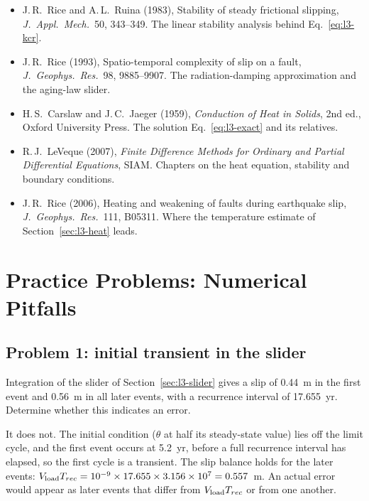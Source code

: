 \begin{itemize}[itemsep=2pt,topsep=2pt]
\item J.\,R.\ Rice and A.\,L.\ Ruina (1983), Stability of steady frictional slipping, \emph{J.\ Appl.\ Mech.}\ 50, 343--349. The linear stability analysis behind Eq.~\eqref{eq:l3-kcr}.
\item J.\,R.\ Rice (1993), Spatio-temporal complexity of slip on a fault, \emph{J.\ Geophys.\ Res.}\ 98, 9885--9907. The radiation-damping approximation and the aging-law slider.
\item H.\,S.\ Carslaw and J.\,C.\ Jaeger (1959), \emph{Conduction of Heat in Solids}, 2nd ed., Oxford University Press. The solution Eq.~\eqref{eq:l3-exact} and its relatives.
\item R.\,J.\ LeVeque (2007), \emph{Finite Difference Methods for Ordinary and Partial Differential Equations}, SIAM. Chapters on the heat equation, stability and boundary conditions.
\item J.\,R.\ Rice (2006), Heating and weakening of faults during earthquake slip, \emph{J.\ Geophys.\ Res.}\ 111, B05311. Where the temperature estimate of Section~\ref{sec:l3-heat} leads.
\end{itemize}

\section{Practice Problems: Numerical Pitfalls}
\label{sec:l3-problems}

\subsection*{Problem 1: initial transient in the slider}

Integration of the slider of Section~\ref{sec:l3-slider} gives a slip of 0.44~m in the first event and 0.56~m in all later events, with a recurrence interval of 17.655~yr. Determine whether this indicates an error.

\solution It does not. The initial condition ($\theta$ at half its steady-state value) lies off the limit cycle, and the first event occurs at 5.2~yr, before a full recurrence interval has elapsed, so the first cycle is a transient. The slip balance holds for the later events: $V_{\mathrm{load}} T_{rec}=10^{-9}\times17.655\times3.156\times10^7=0.557$~m. An actual error would appear as later events that differ from $V_{\mathrm{load}} T_{rec}$ or from one another.

